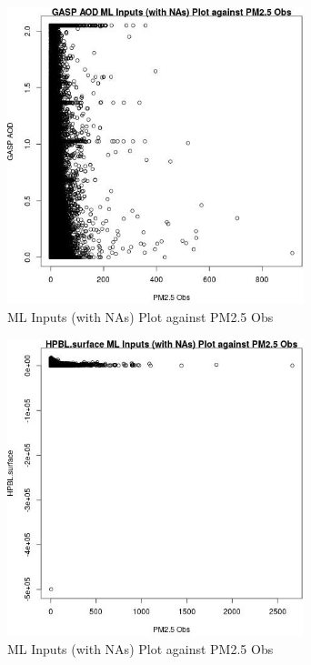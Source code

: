 \begin{figure} 
\centering  
\includegraphics[width=0.77\textwidth]{Code_Outputs/Report_ML_input_PM25_Step4_part_e_de_duplicated_aves_compiled_2019-05-20wNAs_GASP_AODvPM25_Obs.jpg} 
\caption{\label{fig:Report_ML_input_PM25_Step4_part_e_de_duplicated_aves_compiled_2019-05-20wNAsGASP_AODvPM25_Obs}ML Inputs (with NAs) Plot against PM2.5 Obs} 
\end{figure} 
 

\begin{figure} 
\centering  
\includegraphics[width=0.77\textwidth]{Code_Outputs/Report_ML_input_PM25_Step4_part_e_de_duplicated_aves_compiled_2019-05-20wNAs_HPBLsurfacevPM25_Obs.jpg} 
\caption{\label{fig:Report_ML_input_PM25_Step4_part_e_de_duplicated_aves_compiled_2019-05-20wNAsHPBLsurfacevPM25_Obs}ML Inputs (with NAs) Plot against PM2.5 Obs} 
\end{figure} 
 

